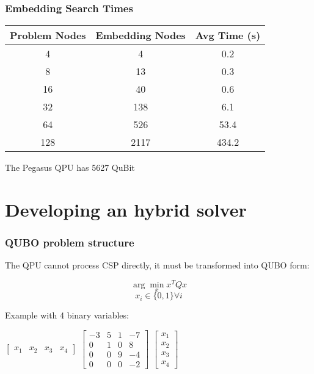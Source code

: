 \documentclass[aspectratio=169]{beamer}
\begin{document}
\begin{frame}\frametitle{Embedding Search Times}

    \begin{table}
        \centering
        \begin{tabular}{c|c|c}
            Problem Nodes & Embedding Nodes & Avg Time (s) \\ \hline
            4 & 4 & 0.2 \\
            8 & 13 & 0.3 \\
            16 & 40 & 0.6 \\
            32 & 138 & 6.1 \\
            64 & 526 & 53.4 \\
            128 & 2117 & 434.2 \\
        \end{tabular}
    \end{table}

    \begin{center}
        The Pegasus QPU has 5627 QuBit
    \end{center}

\end{frame}

\section{Developing an hybrid solver}

\begin{frame}\frametitle{QUBO problem structure}

    The QPU cannot process CSP directly, it must be transformed into QUBO form:

    $$\arg\min_x x^TQx$$
    $$x_i \in \{0, 1\} \forall i$$

    Example with 4 binary variables:

    \begin{center}         
        $\begin{bmatrix}
          x_1 & x_2 & x_3 & x_4
        \end{bmatrix}$
        $\begin{bmatrix}
          -3 & 5 & 1 & -7 \\
          0 & 1 & 0 & 8 \\
          0 & 0 & 9 & -4 \\
          0 & 0 & 0 & -2 
        \end{bmatrix}$
        $\begin{bmatrix}
          x_1 \\ x_2 \\ x_3 \\ x_4
        \end{bmatrix}$      
    \end{center}

\end{frame}
\end{document}
